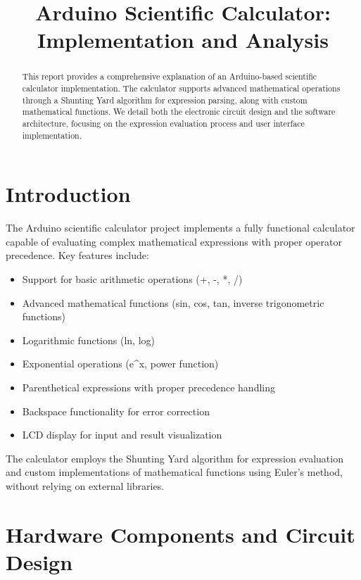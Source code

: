 \documentclass[12pt,a4paper]{article}
\title{Arduino Scientific Calculator:\\ Implementation and Analysis}
\begin{document}
\maketitle

\begin{abstract}
This report provides a comprehensive explanation of an Arduino-based scientific calculator implementation. The calculator supports advanced mathematical operations through a Shunting Yard algorithm for expression parsing, along with custom mathematical functions. We detail both the electronic circuit design and the software architecture, focusing on the expression evaluation process and user interface implementation.
\end{abstract}

\tableofcontents

\section{Introduction}

The Arduino scientific calculator project implements a fully functional calculator capable of evaluating complex mathematical expressions with proper operator precedence. Key features include:

\begin{itemize}
    \item Support for basic arithmetic operations (+, -, *, /)
    \item Advanced mathematical functions (sin, cos, tan, inverse trigonometric functions)
    \item Logarithmic functions (ln, log)
    \item Exponential operations (e\^{}x, power function)
    \item Parenthetical expressions with proper precedence handling
    \item Backspace functionality for error correction
    \item LCD display for input and result visualization
\end{itemize}

The calculator employs the Shunting Yard algorithm for expression evaluation and custom implementations of mathematical functions using Euler's method, without relying on external libraries.

\section{Hardware Components and Circuit Design}
\end{document}
